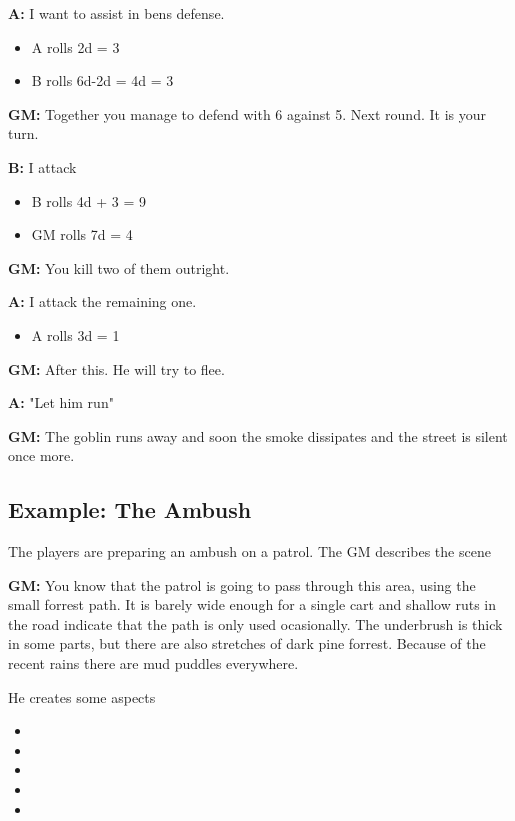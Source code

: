 \documentclass[11pt]{article}
\begin{document}
{\textbf{A:} I want to assist in bens defense.
\begin{itemize}
\item A rolls 2d = 3
\item B rolls 6d-2d = 4d = 3
\end{itemize}

\textbf{GM:} Together you manage to defend with 6 against 5. Next round. It is your turn.

\textbf{B:} I attack
\begin{itemize}
\item B rolls 4d + 3 = 9
\item GM rolls 7d = 4
\end{itemize}

\textbf{GM:} You kill two of them outright.

\textbf{A:} I attack the remaining one.
\begin{itemize}
\item A rolls 3d = 1
\end{itemize}

\textbf{GM:} After this. He will try to flee.

\textbf{A:} "Let him run"

\textbf{GM:} The goblin runs away and soon the smoke dissipates and the street is silent once more.
\subsection{Example: The Ambush}
\label{sec:org7a85214}

The players are preparing an ambush on a patrol. The GM describes the scene

\textbf{GM:} You know that the patrol is going to pass through this area, using the small forrest path. It is barely wide enough for a single cart and shallow ruts in the road indicate that the path is only used ocasionally. The underbrush is thick in some parts, but there are also stretches of dark pine forrest. Because of the recent rains there are mud puddles everywhere.

He creates some aspects
\begin{itemize}
\item {}
\item {}
\item {}
\item {}
\item {}
\end{itemize}

}
\end{document}

